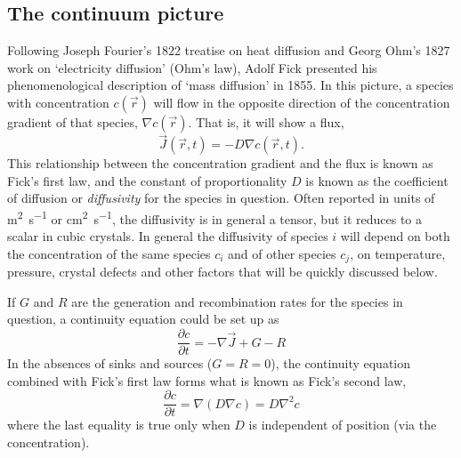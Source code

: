 \documentclass[11pt,bibliography=totoc,index=totoc]{scrbook}   %
\begin{document}
%
\subsection{The continuum picture}\label{sec:ContinuumPicture}
%

Following Joseph Fourier's 1822 treatise on heat diffusion\cite{Fourier:1822} and Georg Ohm's 1827 work on `electricity diffusion' (Ohm's law),\cite{Ohm:1827} Adolf Fick presented his phenomenological description of `mass diffusion' in 
1855.\cite{Fick:1855}
In this picture, a species with concentration $c(\vec{r})$ will flow in the opposite direction of the concentration gradient of that species, $\nabla c(\vec{r})$. That is, it will show a flux,
\begin{equation}
  \vec{J}(\vec{r},t) = - D \nabla c(\vec{r},t).
  \label{eq:ficks1st}
\end{equation}
This relationship between the concentration gradient and the flux is known as Fick's first law, and the constant of proportionality $D$ is known as the coefficient of diffusion or \emph{diffusivity} for the species in question. 
Often reported in units of \si{\metre\squared\per\second} or \si{\centi\metre\squared\per\second}, the diffusivity is in general a tensor, but it reduces to a scalar in cubic crystals. 
In general the diffusivity of species $i$ will depend on both the concentration of the same species $c_i$ and of other species $c_j$, on temperature, pressure, crystal defects and other factors that will be quickly discussed below.

If $G$ and $R$ are the generation and recombination rates for the species in question, a continuity equation could be set up as
\begin{equation}
    \frac{\partial c}{\partial t} = -\nabla \vec{J} + G - R
  \label{eq:continuity}
\end{equation}
In the absences of sinks and sources ($G=R=0$), the continuity equation combined with Fick's first law forms what is known as Fick's second law,
\begin{equation}
    \frac{\partial c}{\partial t} = \nabla (D \nabla c) = D \nabla^2 c
  \label{eq:ficks2nd}
\end{equation}
where the last equality is true only when $D$ is independent of position (via the concentration).
\end{document}
